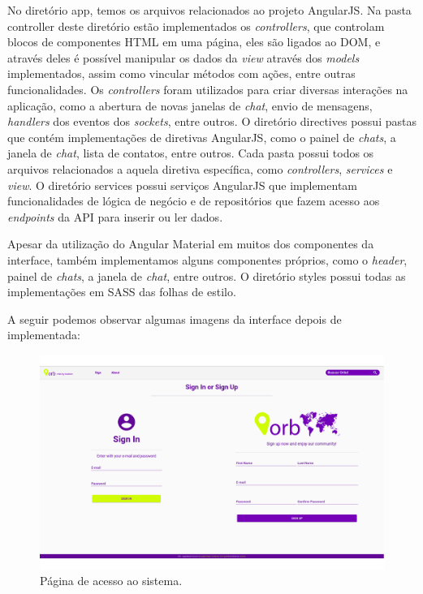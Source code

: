 No diretório app, temos os arquivos relacionados ao projeto AngularJS. Na pasta controller deste diretório estão implementados os \textit{controllers}, que controlam blocos de componentes HTML em uma página, eles são ligados ao DOM, e através deles é possível manipular os dados da \textit{view} através dos \textit{models} implementados, assim como vincular métodos com ações, entre outras funcionalidades. Os \textit{controllers} foram utilizados para criar diversas interações na aplicação, como a abertura de novas janelas de \textit{chat}, envio de mensagens, \textit{handlers} dos eventos dos \textit{sockets}, entre outros. O diretório directives possui pastas que contém implementações de diretivas AngularJS, como o painel de \textit{chats}, a janela de \textit{chat}, lista de contatos, entre outros. Cada pasta possui todos os arquivos relacionados a aquela diretiva específica, como \textit{controllers}, \textit{services} e \textit{view}. O diretório services possui serviços AngularJS que implementam funcionalidades de lógica de negócio e de repositórios que fazem acesso aos \textit{endpoints} da API para inserir ou ler dados.

Apesar da utilização do Angular Material em muitos dos componentes da interface, também implementamos alguns componentes próprios, como o \textit{header}, painel de \textit{chats}, a janela de \textit{chat}, entre outros. O diretório styles possui todas as implementações em SASS das folhas de estilo.

A seguir podemos observar algumas imagens da interface depois de implementada:

\begin{figure}[!htb]
	\centering
	\includegraphics[scale=0.37]{imagens/pagina_signin.png}
	\caption{\small Página de acesso ao sistema.}
	\label{fig:pagina-signin}
\end{figure}

